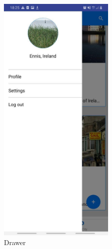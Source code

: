 \begin{figure}[ht]
    \centering
    \includegraphics[width=0.5\textwidth]{img/drawer.jpg}
     \caption{Drawer}
    \label{fig:Drawer}
\end{figure}


